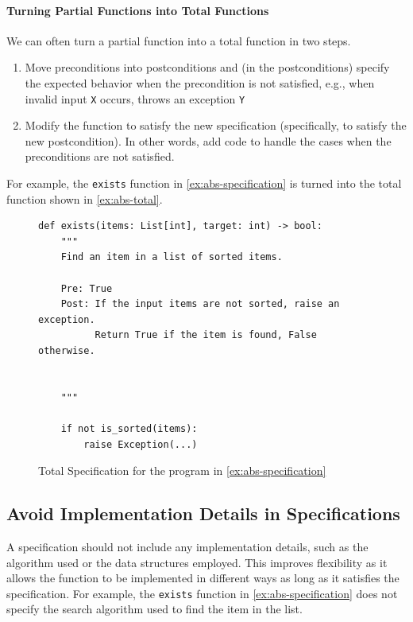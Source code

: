 \documentclass[oneside,11pt,dvipsnames]{book}
\newcommand{\code}[1]{\texttt{#1}}
\begin{document}
\paragraph{Turning Partial Functions into Total Functions} We can often turn a partial function into a total function in two steps. 
\begin{enumerate}

    \item Move preconditions into postconditions and (in the postconditions) specify the expected behavior when the precondition is not satisfied, e.g., when invalid input \code{X} occurs, throws an exception \code{Y} 

    \item Modify the function to satisfy the new specification (specifically, to satisfy the new postcondition).  In other words, add code to handle the cases when the preconditions are not satisfied. 
\end{enumerate}

For example, the \code{exists} function in \autoref{ex:abs-specification} is turned into the total function shown in \autoref{ex:abs-total}.

\begin{figure}
\begin{lstlisting}
def exists(items: List[int], target: int) -> bool:
    """
    Find an item in a list of sorted items.

    Pre: True
    Post: If the input items are not sorted, raise an exception.
          Return True if the item is found, False otherwise.


    """

    if not is_sorted(items):
        raise Exception(...)
\end{lstlisting}
\caption{Total Specification for the program in \autoref{ex:abs-specification}}\label{ex:abs-total}
\end{figure}



\subsection{Avoid Implementation Details in Specifications}

A specification should not include any implementation details, such as the algorithm used or the data structures employed. This improves flexibility as it allows the function to be implemented in different ways as long as it satisfies the specification. For example, the \code{exists} function in \autoref{ex:abs-specification} does not specify the search algorithm used to find the item in the list.
\end{document}
